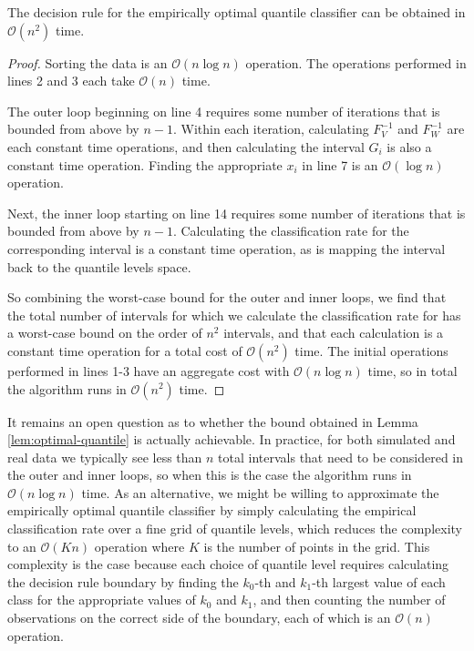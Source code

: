 \begin{lemma}
  \label{lem:optimal-quantile}
  The decision rule for the empirically optimal quantile classifier can be
  obtained in $\mathcal{O}(n^2)$ time.
\end{lemma}

\begin{proof}
  Sorting the data is an $\mathcal{O}(n \log n)$ operation.  The operations
  performed in lines 2 and 3 each take $\mathcal{O}(n)$ time.

  The outer loop beginning on line 4 requires some number of iterations that is
  bounded from above by $n - 1$.  Within each iteration, calculating $F_V^{-1}$
  and $F_W^{-1}$ are each constant time operations, and then calculating the
  interval $G_i$ is also a constant time operation.  Finding the appropriate
  $x_i$ in line 7 is an $\mathcal{O}(\log n)$ operation.

  Next, the inner loop starting on line 14 requires some number of iterations
  that is bounded from above by $n - 1$.  Calculating the classification rate
  for the corresponding interval is a constant time operation, as is mapping the
  interval back to the quantile levels space.

  So combining the worst-case bound for the outer and inner loops, we find that
  the total number of intervals for which we calculate the classification rate
  for has a worst-case bound on the order of $n^2$ intervals, and that each
  calculation is a constant time operation for a total cost of
  $\mathcal{O}(n^2)$ time.  The initial operations performed in lines 1-3 have
  an aggregate cost with $\mathcal{O}(n \log n)$ time, so in total the algorithm
  runs in $\mathcal{O}(n^2)$ time.
\end{proof}

It remains an open question as to whether the bound obtained in Lemma
\ref{lem:optimal-quantile} is actually achievable.  In practice, for both
simulated and real data we typically see less than $n$ total intervals that need
to be considered in the outer and inner loops, so when this is the case the
algorithm runs in $\mathcal{O}(n \log n)$ time.  As an alternative, we might be
willing to approximate the empirically optimal quantile classifier by simply
calculating the empirical classification rate over a fine grid of quantile
levels, which reduces the complexity to an $\mathcal{O}(Kn)$ operation where $K$
is the number of points in the grid.  This complexity is the case because each
choice of quantile level requires calculating the decision rule boundary by
finding the $k_0$-th and $k_1$-th largest value of each class for the
appropriate values of $k_0$ and $k_1$, and then counting the number of
observations on the correct side of the boundary, each of which is an
$\mathcal{O}(n)$ operation.




